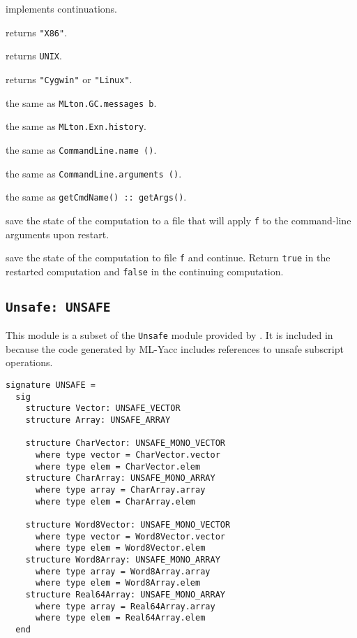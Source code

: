 \begin{description}

 implements continuations.

returns {\tt "X86"}.

returns {\tt UNIX}.

returns {\tt "Cygwin"} or {\tt "Linux"}.

the same as {\tt MLton.GC.messages b}.

the same as {\tt MLton.Exn.history}.

the same as {\tt CommandLine.name ()}.

the same as {\tt CommandLine.arguments ()}.

the same as {\tt getCmdName() :: getArgs()}.

save the state of the computation to a file that will apply {\tt f} to
the command-line arguments upon restart.

save the state of the computation to file {\tt f} and continue.
Return {\tt true} in the restarted computation and {\tt false} in the
continuing computation.

\end{description}
%
\subsection{{\tt Unsafe: UNSAFE}}

This module is a subset of the {\tt Unsafe} module provided by
{\smlnj}.  It is included in {\mlton} because the code generated by
ML-Yacc includes references to unsafe subscript operations.

\begin{verbatim}
signature UNSAFE =
  sig
    structure Vector: UNSAFE_VECTOR
    structure Array: UNSAFE_ARRAY

    structure CharVector: UNSAFE_MONO_VECTOR
      where type vector = CharVector.vector
      where type elem = CharVector.elem
    structure CharArray: UNSAFE_MONO_ARRAY
      where type array = CharArray.array
      where type elem = CharArray.elem

    structure Word8Vector: UNSAFE_MONO_VECTOR
      where type vector = Word8Vector.vector
      where type elem = Word8Vector.elem
    structure Word8Array: UNSAFE_MONO_ARRAY
      where type array = Word8Array.array
      where type elem = Word8Array.elem
    structure Real64Array: UNSAFE_MONO_ARRAY
      where type array = Real64Array.array
      where type elem = Real64Array.elem
  end
\end{verbatim}
